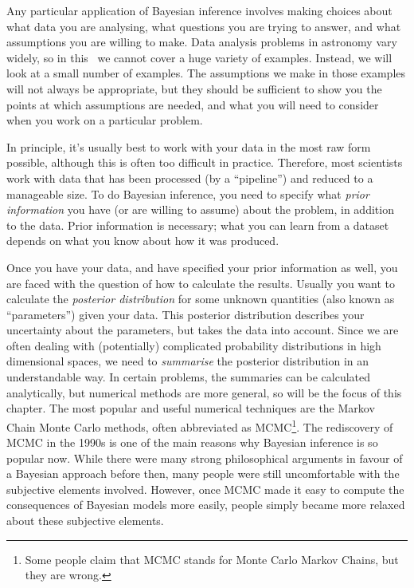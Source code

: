 Any particular application of Bayesian inference involves making choices
about what data you are analysing, what questions you are
trying to answer, and what assumptions you are willing to make.
Data analysis problems in astronomy vary widely, so in this \documentname~we
cannot cover a huge variety of examples. Instead, we will look at a small
number of examples. The assumptions we make in those examples will not always
be appropriate, but they should be sufficient to show you the points at which
assumptions are needed, and what you will need to consider when you work on a particular problem.

In principle, it's usually best to work with your data in the most
raw form possible, although this is often too difficult in practice.
Therefore, most scientists work with data that has been processed (by a ``pipeline'') and reduced to a manageable size. To do Bayesian inference, you
need to specify what {\it prior information} you have (or are willing to
assume) about the problem, in addition to the data. Prior information is
necessary; what you can learn from a dataset depends on what you know
about how it was produced.

Once you have your data, and have specified your prior information as well,
you are faced with the question of how to calculate the
results. Usually you want to calculate the {\it posterior distribution} for some
unknown quantities (also known as ``parameters'') given your data. This
posterior distribution
describes your uncertainty about the parameters, but takes the data into account.
Since we are often dealing with (potentially) complicated probability
distributions in high dimensional spaces, we need to {\it summarise} the
posterior distribution in an understandable way.
In certain problems, the summaries can be calculated analytically, but
numerical methods are more general, so will be the focus of this chapter.
The most popular and useful numerical techniques are the Markov Chain Monte
Carlo methods, often abbreviated as
MCMC\footnote{Some people claim that MCMC stands for
Monte Carlo Markov Chains, but they are wrong.}.
The rediscovery of MCMC in the 1990s
is one of the main reasons why Bayesian inference is so popular now.
While there were many strong philosophical arguments in favour of a Bayesian
approach before then, many people were still uncomfortable with the
subjective elements involved. However, once MCMC made it easy to compute the
consequences of Bayesian models more easily, people simply became more relaxed
about these subjective elements.

